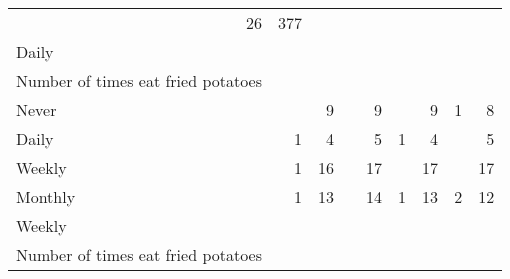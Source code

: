 \documentclass{article}
\begin{document}
\begin{tabular}{lllllllll}
  \multicolumn{1}{r}{26} &
  \multicolumn{1}{r}{377} \\
\multicolumn{1}{l}{\hspace{3em}Daily} &
  \multicolumn{1}{|r}{} &
  \multicolumn{1}{r}{} &
  \multicolumn{1}{r}{} &
  \multicolumn{1}{r}{} &
  \multicolumn{1}{r}{} &
  \multicolumn{1}{r}{} &
  \multicolumn{1}{r}{} &
  \multicolumn{1}{r}{} \\
\multicolumn{1}{l}{\hspace{4em}Number of times eat fried potatoes} &
  \multicolumn{1}{|r}{} &
  \multicolumn{1}{r}{} &
  \multicolumn{1}{r}{} &
  \multicolumn{1}{r}{} &
  \multicolumn{1}{r}{} &
  \multicolumn{1}{r}{} &
  \multicolumn{1}{r}{} &
  \multicolumn{1}{r}{} \\
\multicolumn{1}{l}{\hspace{5em}Never} &
  \multicolumn{1}{|r}{} &
  \multicolumn{1}{r}{9} &
  \multicolumn{1}{r}{} &
  \multicolumn{1}{r}{9} &
  \multicolumn{1}{r}{} &
  \multicolumn{1}{r}{9} &
  \multicolumn{1}{r}{1} &
  \multicolumn{1}{r}{8} \\
\multicolumn{1}{l}{\hspace{5em}Daily} &
  \multicolumn{1}{|r}{1} &
  \multicolumn{1}{r}{4} &
  \multicolumn{1}{r}{} &
  \multicolumn{1}{r}{5} &
  \multicolumn{1}{r}{1} &
  \multicolumn{1}{r}{4} &
  \multicolumn{1}{r}{} &
  \multicolumn{1}{r}{5} \\
\multicolumn{1}{l}{\hspace{5em}Weekly} &
  \multicolumn{1}{|r}{1} &
  \multicolumn{1}{r}{16} &
  \multicolumn{1}{r}{} &
  \multicolumn{1}{r}{17} &
  \multicolumn{1}{r}{} &
  \multicolumn{1}{r}{17} &
  \multicolumn{1}{r}{} &
  \multicolumn{1}{r}{17} \\
\multicolumn{1}{l}{\hspace{5em}Monthly} &
  \multicolumn{1}{|r}{1} &
  \multicolumn{1}{r}{13} &
  \multicolumn{1}{r}{} &
  \multicolumn{1}{r}{14} &
  \multicolumn{1}{r}{1} &
  \multicolumn{1}{r}{13} &
  \multicolumn{1}{r}{2} &
  \multicolumn{1}{r}{12} \\
\multicolumn{1}{l}{\hspace{3em}Weekly} &
  \multicolumn{1}{|r}{} &
  \multicolumn{1}{r}{} &
  \multicolumn{1}{r}{} &
  \multicolumn{1}{r}{} &
  \multicolumn{1}{r}{} &
  \multicolumn{1}{r}{} &
  \multicolumn{1}{r}{} &
  \multicolumn{1}{r}{} \\
\multicolumn{1}{l}{\hspace{4em}Number of times eat fried potatoes} &
  \multicolumn{1}{|r}{} &
  \multicolumn{1}{r}{} &
  \multicolumn{1}{r}{} &
  \multicolumn{1}{r}{} &

\end{tabular}
\end{document}
